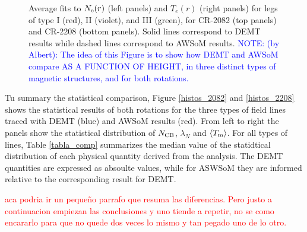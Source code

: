 \documentclass[namedreferences]{solarphysics}
\newcommand{\lN}{\lambda_N}
\newcommand{\NCB}{N_{\rm CB}}
\newcommand{\Tm}{T_{\rm m}}
\newcommand{\aTm}{\left<\Tm\right>}
\newcommand{\Ne}{N_{\rm e}}
\def\diego#1{\textcolor{red}{#1}}
\def\notebyalbert#1{\textcolor{blue}{NOTE: #1}}
\begin{document}
\begin{article}
\begin{figure}[h!]
\begin{center}
\caption{{Average fits to $\Ne(r)$ (left panels) and $T_e(r)$ (right panels) for legs of type I (red), II (violet), and III (green), for CR-2082 (top panels) and CR-2208 (bottom panels). Solid lines correspond to DEMT results while dashed lines correspond to AWSoM results.} \notebyalbert{(by Albert): The idea of this Figure is to show how DEMT and AWSoM compare AS A FUNCTION OF HEIGHT, in three distinct types of magnetic structures, and for both rotations.}}
\label{perfiles_promedio}
\end{center}
\end{figure}

Tu summary the statistical comparison, Figure \ref{histos_2082} and \ref{histos_2208} shows the statistical results of both rotations for the three types of field lines traced with DEMT (blue) and AWSoM results (red). From left to right the panels show the statistical distribution of $\NCB$, $\lN$ and $\aTm$. For all types of lines, Table \ref{tabla_comp} summarizes the median value of the statidtical distribution of each physical quantity derived from the analysis. The DEMT quantities are expressed as absoulte values, while for ASWSoM they are informed relative to the corresponding result for DEMT.


\diego{aca podria ir un pequeño parrafo que resuma las diferencias. Pero justo a continuacion empiezan las conclusiones y uno tiende a repetir, no se como encararlo para que no quede dos veces lo mismo y tan pegado uno de lo otro.}


\end{article}
\end{document}
